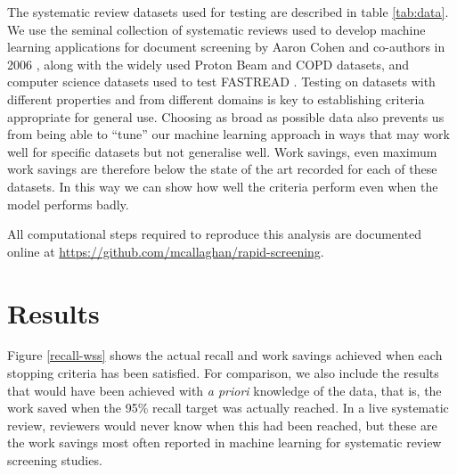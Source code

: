\documentclass{bmcart}
\begin{document}
	The systematic review datasets used for testing are described in table \ref{tab:data}. We use the seminal collection of systematic reviews used to develop machine learning applications for document screening by Aaron Cohen and co-authors in 2006 \cite{Cohen2006}, along with the widely used Proton Beam \cite{Terasawa2009} and COPD \cite{Castaldi2009} datasets, and computer science datasets used to test FASTREAD \cite{Yu2019}. Testing on datasets with different properties and from different domains is key to establishing criteria appropriate for general use. Choosing as broad as possible data also prevents us from being able to ``tune'' our machine learning approach in ways that may work well for specific datasets but not generalise well. Work savings, even maximum work savings are therefore below the state of the art recorded for each of these datasets. In this way we can show how well the criteria perform even when the model performs badly.


	All computational steps required to reproduce this analysis are documented online at \url{https://github.com/mcallaghan/rapid-screening}.

	\section*{Results}

	Figure \ref{recall-wss} shows the actual recall and work savings achieved when each stopping criteria has been satisfied. 
	For comparison, we also include the results that would have been achieved with \textit{a priori} knowledge of the data, that is, the work saved when the 95\% recall target was actually reached. In a live systematic review, reviewers would never know when this had been reached, but these are the work savings most often reported in machine learning for systematic review screening studies.
\end{document}
